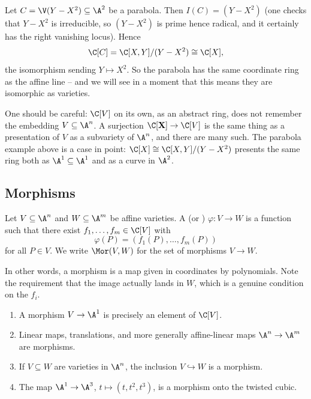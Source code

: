 \begin{example}
	Let $C = \V(Y - X^2) \subseteq \A^2$ be a parabola. Then $I(C) = (Y - X^2)$ (one checks that $Y - X^2$ is irreducible, so $(Y-X^2)$ is prime hence radical, and it certainly has the right vanishing locus). Hence
	$$\C[C] = \C[X,Y]/(Y-X^2) \cong \C[X],$$
	the isomorphism sending $Y \mapsto X^2$. So the parabola has the same coordinate ring as the affine line -- and we will see in a moment that this means they are isomorphic as varieties.
\end{example}

\begin{remark}
	One should be careful: $\C[V]$ on its own, as an abstract ring, does not remember the embedding $V \subseteq \A^n$. A surjection $\C[\mathbf{X}] \to \C[V]$ is the same thing as a presentation of $V$ as a subvariety of $\A^n$, and there are many such. The parabola example above is a case in point: $\C[X] \cong \C[X,Y]/(Y-X^2)$ presents the same ring both as $\A^1 \subseteq \A^1$ and as a curve in $\A^2$.
\end{remark}

\subsection{Morphisms}

\begin{definition}[Morphism]
	Let $V \subseteq \A^n$ and $W \subseteq \A^m$ be affine varieties. A  (or ) $\varphi \colon V \to W$ is a function such that there exist $f_1,\dots,f_m \in \C[V]$ with
	$$\varphi(P) = (f_1(P),\dots,f_m(P))$$
	for all $P \in V$. We write $\Mor(V,W)$ for the set of morphisms $V \to W$.
\end{definition}

In other words, a morphism is a map given in coordinates by polynomials. Note the requirement that the image actually lands in $W$, which is a genuine condition on the $f_i$.

\begin{example}
	\begin{enumerate}[label=(\roman*)]
		\item A morphism $V \to \A^1$ is precisely an element of $\C[V]$.
		\item Linear maps, translations, and more generally affine-linear maps $\A^n \to \A^m$ are morphisms.
		\item If $V \subseteq W$ are varieties in $\A^n$, the inclusion $V \hookrightarrow W$ is a morphism.
		\item The map $\A^1 \to \A^3$, $t \mapsto (t,t^2,t^3)$, is a morphism onto the twisted cubic.
	\end{enumerate}
\end{example}

